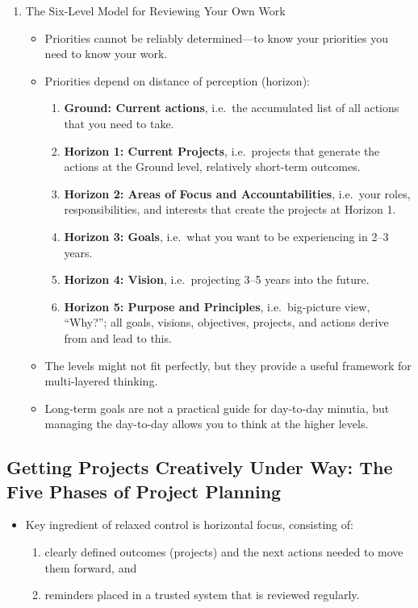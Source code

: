 \documentclass{article}
\begin{document}
\begin{itemize}
\begin{enumerate}
\begin{enumerate}
      \end{enumerate}
      \item The Six-Level Model for Reviewing Your Own Work
      \begin{itemize}
        \item Priorities cannot be reliably determined---to know your priorities you need to know your work.
        \item Priorities depend on distance of perception (horizon):
        \begin{enumerate}
            \item \textbf{Ground: Current actions}, i.e.\ the accumulated list of all actions that you need to take.
            \item \textbf{Horizon 1: Current Projects}, i.e.\ projects that generate the actions at the Ground level, relatively short-term outcomes.
            \item \textbf{Horizon 2: Areas of Focus and Accountabilities}, i.e.\ your roles, responsibilities, and interests that create the pro\-jects at Horizon 1.
            \item \textbf{Horizon 3: Goals}, i.e.\ what you want to be experiencing in 2--3 years.
            \item \textbf{Horizon 4: Vision}, i.e.\ projecting 3--5 years into the future.
            \item \textbf{Horizon 5: Purpose and Principles}, i.e.\ big-picture view, ``Why?''; all goals, visions, objectives, projects, and actions derive from and lead to this.
        \end{enumerate}
        \item The levels might not fit perfectly, but they provide a useful framework for multi-layered thinking.
        \item Long-term goals are not a practical guide for day-to-day minutia, but managing the day-to-day allows you to think at the higher levels.
      \end{itemize}
  \end{enumerate}
\end{itemize}

\subsection{Getting Projects Creatively Under Way: The Five Phases of Project Planning}

\begin{itemize}
  \item Key ingredient of relaxed control is horizontal focus, consisting of:
  \begin{enumerate}
      \item clearly defined outcomes (projects) and the next actions needed to move them forward, and
      \item reminders placed in a trusted system that is reviewed regularly.
  \end{enumerate}
\end{itemize}
\end{document}
